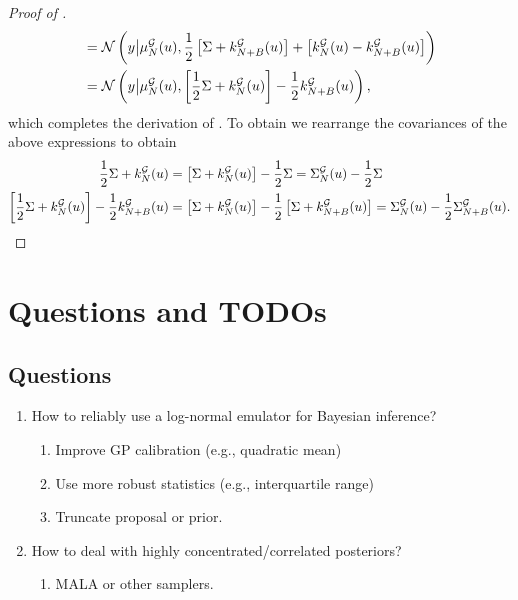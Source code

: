 \documentclass[12pt]{article}
\begin{document}
\begin{proof} [Proof of ]
\begin{align*}
&= \Gaussian\left(\obs \big| \emMean[\Ndesign]{\fwd}(\Par), \frac{1}{2} \left[\likPar + \emKer[\Naugment]{\fwd}(\Par)\right] + \left[\emKer[\Ndesign]{\fwd}(\Par) - \emKer[\Naugment]{\fwd}(\Par)\right] \right) \\
&= \Gaussian\left(\obs \big| \emMean[\Ndesign]{\fwd}(\Par), \left[\frac{1}{2}\likPar + \emKer[\Ndesign]{\fwd}(\Par)\right] - \frac{1}{2} \emKer[\Naugment]{\fwd}(\Par)\right),
\end{align*}
which completes the derivation of . To obtain  we rearrange the covariances of the above expressions to obtain 
\begin{align*}
\frac{1}{2}\likPar + \emKer[\Ndesign]{\fwd}(\Par) &= 
\left[\likPar +  \emKer[\Ndesign]{\fwd}(\Par) \right] - \frac{1}{2}\likPar 
= \CovComb(\Par) - \frac{1}{2}\likPar \\
\left[\frac{1}{2}\likPar + \emKer[\Ndesign]{\fwd}(\Par)\right] - \frac{1}{2} \emKer[\Naugment]{\fwd}(\Par)
&= \left[\likPar + \emKer[\Ndesign]{\fwd}(\Par) \right] - \frac{1}{2}\left[\likPar + \emKer[\Naugment]{\fwd}(\Par) \right] 
= \CovComb(\Par) - \frac{1}{2} \CovComb[\Naugment](\Par). 
\end{align*}

\end{proof}


\section{Questions and TODOs}
\subsection{Questions}
\begin{enumerate}
\item How to reliably use a log-normal emulator for Bayesian inference? 
	\begin{enumerate}
	\item Improve GP calibration (e.g., quadratic mean) 
	\item Use more robust statistics (e.g., interquartile range)
	\item Truncate proposal or prior. 
	\end{enumerate}
\item How to deal with highly concentrated/correlated posteriors? 
	\begin{enumerate}
	\item MALA or other samplers. 
	\end{enumerate}
\end{enumerate}
\end{document}

